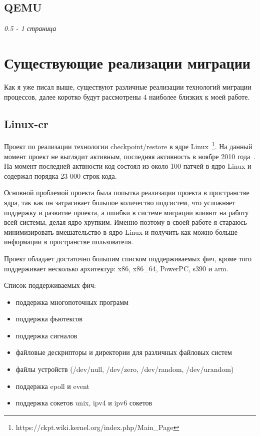 \subsection{QEMU}

\textit{0.5 - 1 страница}

\section{Существующие реализации миграции}

Как я уже писал выше, существуют различные реализации технологий миграции процессов, далее коротко будут рассмотрены 4 наиболее близких к моей работе.

\subsection{Linux-cr}
\label{linux_cr}

Проект по реализации технологии checkpoint/restore в ядре Linux~\footnote{https://ckpt.wiki.kernel.org/index.php/Main\_Page}. На данный момент проект не выглядит активным, последняя активность в ноябре 2010 года~\cite{linux_cr_lwn_report}. На момент последней актвности код состоял из около 100 патчей в ядро Linux и содержал порядка 23 000 строк кода.

Основной проблемой проекта была попытка реализации проекта в пространстве ядра, так как он затрагивает большое количество подсистем, что усложняет поддержку и развитие проекта, а ошибки в системе миграции влияют на работу всей системы, делая ядро хрупким. Именно поэтому в своей работе я стараюсь минимизировать вмешательство в ядро Linux и получить как можно больше информации в пространстве пользователя.

Проект обладает достаточно большим списком поддерживаемых фич, кроме того поддерживает несколько архитектур: x86, x86\_64, PowerPC, s390 и arm.

Список поддерживаемых фич:

\begin{itemize}

    \item поддержка многопоточных программ
    \item поддержка фьютексов
    \item поддержка сигналов
    \item файловые дескрипторы и директории для различных файловых систем
    \item файлы устройств (/dev/null, /dev/zero, /dev/random, /dev/urandom)
    \item поддержка epoll и event
    \item поддержка сокетов unix, ipv4 и ipv6 сокетов

\end{itemize}


